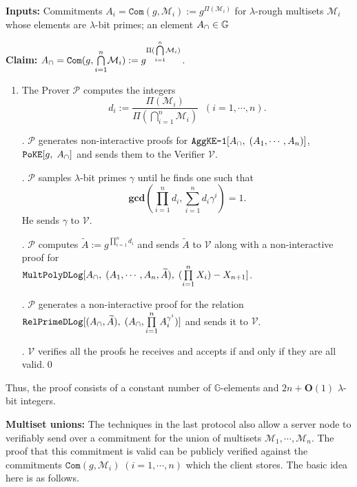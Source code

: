 \documentclass[11pt, lettersize, notitlepage, leqno, footskip=0.6cm]{article}
\newcommand{\pl}{\prod\limits}
\newcommand{\slim}{\sum\limits}
\newcommand{\ttt}{\texttt}
\newcommand{\bG}{\mathbb{G}}
\newcommand{\pr}{\protect}
\newcommand{\wti}{\widetilde}
\newcommand{\mc}{\mathcal}
\newcommand{\mb}{\mathbb}
\newcommand{\mbf}{\mathbf}
\newcommand{\lam}{\lambda}
\newcommand{\bO}{\mbf{O}}
\newcommand{\mP}{\mc{P}}
\newcommand{\V}{\mc{V}}
\newcommand{\mcM}{\mc{M}}
\newcommand{\vs}{\vspace{-0.15cm}}
\newcommand{\noin}{\noindent}
\newcommand{\GCD}{\mbf{gcd}}
\numberwithin{equation}{section}
\begin{document}
\noin \textbf{Inputs:} Commitments $A_i = \ttt{Com}(g, \mcM_i) := g^{\Pi(\mc{M}_i)}$ for $\lam$-rough multisets $\mc{M}_i$ whose elements are $\lam$-bit primes; an element $A_{\tt{\cap}}\in\mb{G}$

\noin \textbf{Claim:} $A_{\tt{\cap}} = \protect{\verb|Com|}(g, {\bigcap\limits_{i=1}^n} \mc{M}_i) := g^{\Pi({\bigcap\limits_{i=1}^n} \mc{M}_i)}$.

\begin{enumerate}[wide, labelwidth=!, labelindent=0pt]\vs \item The Prover $\mP$ computes the integers \vs $$d_i:= \frac{\Pi(\mc{M}_i)}{\Pi({\bigcap\limits_{i=1}^n} \mc{M}_i)}\;\; (i=1,\cdots,n).$$ \vs

\noin 2. $\mP$ generates non-interactive proofs for $\pr{\ttt{AggKE-1}}[A_{\tt{\cap}},\;(A_1,\cdots,A_n)]$, $\ttt{PoKE}[g,\;A_{\tt{\cap}}]$ and sends them to the Verifier $\V$.

\noin 3. $\mP$ samples $\lam$-bit primes $\gamma$ until he finds one such that \vs $$ \GCD(\pl_{i=1}^n d_i, \slim_{i=1}^n d_i\gamma^i) = 1.$$ He sends $\gamma$ to $\V$.

\noin 4. $\mP$ computes $\wti{A}:= g^{\pl_{i=1}^n d_i}$ and sends $\wti{A}$ to $\V$ along with a non-interactive proof for\\ $\ttt{MultPolyDLog}[A_{\tt{\cap}},\; (A_1,\cdots,A_n, \wti{A}),\;(\pl_{i=1}^n X_i)-X_{n+1}]$.\vs

\noin 5. $\mP$ generates a non-interactive proof for the relation $\ttt{RelPrimeDLog}[(A_{\tt{\cap}}, \wti{A}),\;(A_{\tt{\cap}}, \pl_{i=1}^n A_i^{\gamma^i})]$ and sends it to $\V$.

\noin 6. $\V$ verifies all the proofs he receives and accepts if and only if they are all valid.\qed \end{enumerate}


\noin Thus, the proof consists of a constant number of $\bG$-elements and $2n+\bO(1)$ $\lam$-bit integers. 
 






\bigskip


\noin \textbf{Multiset unions:} The techniques in the last protocol also allow a server node to verifiably send over a commitment for the union of multisets $\mcM_1,\cdots,\mcM_n$. The proof that this commitment is valid can be publicly verified against the commitments $\ttt{Com}(g,\mc{M}_i)\;(i=1,\cdots,n)$ which the client stores. The basic idea here is as follows.
\end{document}
